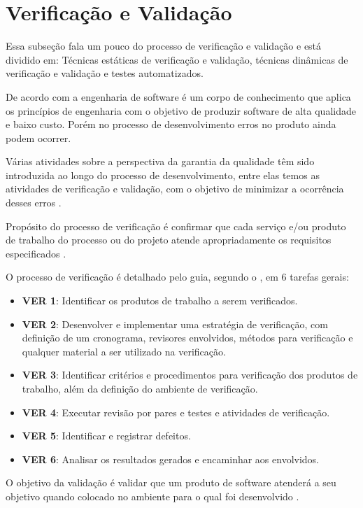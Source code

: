 \section{Verificação e Validação}

Essa subseção fala um pouco do processo de verificação e validação e está dividido em: Técnicas estáticas de verificação e validação, técnicas dinâmicas de verificação e validação e testes automatizados.

De acordo com \cite{pressman} a engenharia de software é um corpo de conhecimento que aplica os princípios de engenharia com o objetivo de produzir software de alta qualidade e baixo custo. Porém no processo de desenvolvimento erros no produto ainda podem ocorrer.

Várias atividades sobre a perspectiva da garantia da qualidade têm sido introduzida ao longo do processo de desenvolvimento, entre elas temos as atividades de verificação e validação, com o objetivo de minimizar a ocorrência desses erros \cite{jino}.

Propósito do processo de verificação é confirmar que cada serviço e/ou produto de trabalho do processo ou do projeto atende apropriadamente os requisitos especificados \cite{pressman1}.

O processo de verificação é detalhado pelo guia, segundo o \cite{mpsbr}, em 6 tarefas gerais:

\begin{itemize}
  \item \textbf{VER 1}: Identificar os produtos de trabalho a serem verificados.
  \item \textbf{VER 2}: Desenvolver e implementar uma estratégia de verificação, com definição de um cronograma,
    revisores envolvidos, métodos para verificação e qualquer material a ser utilizado na verificação.
  \item \textbf{VER 3}: Identificar critérios e procedimentos para verificação dos produtos de trabalho,
    além da definição do ambiente de verificação.
  \item \textbf{VER 4}: Executar revisão por pares e testes e atividades de verificação.
  \item \textbf{VER 5}: Identificar e registrar defeitos.
  \item \textbf{VER 6}: Analisar os resultados gerados e encaminhar aos envolvidos.
\end{itemize}

O objetivo da validação é validar que um produto de software atenderá a seu objetivo quando colocado no ambiente para o qual foi desenvolvido \cite{sommerville}.

